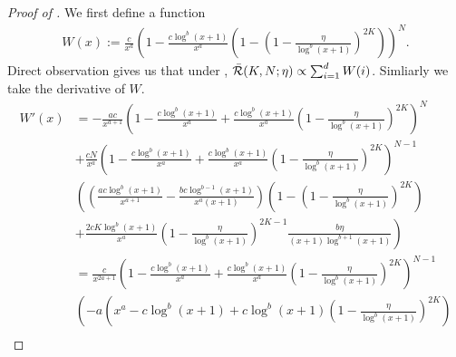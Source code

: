 \begin{proof}[Proof of ]
We first define a function
\begin{align*}
    W(x) := \frac{c}{x^{a}}\left(1-\frac{c\log^b (x+1)}{x^{a}}\left(1-\left(1-\frac{\eta}{\log^b (x+1)}\right)^{2K}\right)\right)^N.
\end{align*}
Direct observation gives us that under , $\bar{\mathcal{R}}(K,N;\eta) \propto \sum_{i=1}^d W(i)$. Simliarly we take the derivative of $W$.
\begin{align*}
    W'(x) &= -\frac{ac}{x^{a+1}}\left(1-\frac{c\log^b (x+1)}{x^{a}}+\frac{c\log^b (x+1)}{x^{a}}\left(1-\frac{\eta}{\log^b (x+1)}\right)^{2K}\right)^N \\
    &+\frac{cN}{x^{a}}\left(1-\frac{c\log^b (x+1)}{x^{a}}+\frac{c\log^b (x+1)}{x^{a}}\left(1-\frac{\eta}{\log^b (x+1)}\right)^{2K}\right)^{N-1}\\
    &\left(\left(\frac{ac\log^b (x+1)}{x^{a+1}}-\frac{bc\log^{b-1}(x+1)}{x^{a}(x+1)}\right)\left(1-\left(1-\frac{\eta}{\log^b (x+1)}\right)^{2K}\right) \right. \\
    &\left.+\frac{2cK\log^b (x+1)}{x^{a}}\left(1-\frac{\eta}{\log^b (x+1)}\right)^{2K-1}\frac{b\eta}{(x+1)\log^{b+1}(x+1)}\right) \\
    &=\frac{c}{x^{2a+1}}\left(1-\frac{c\log^b (x+1)}{x^{a}}+\frac{c\log^b (x+1)}{x^{a}}\left(1-\frac{\eta}{\log^b (x+1)}\right)^{2K}\right)^{N-1} \\
    &\left(-a\left(x^a-c\log^b (x+1)+c\log^b (x+1)\left(1-\frac{\eta}{\log^b (x+1)}\right)^{2K}\right)\right. \\

\end{align*}
\end{proof}
